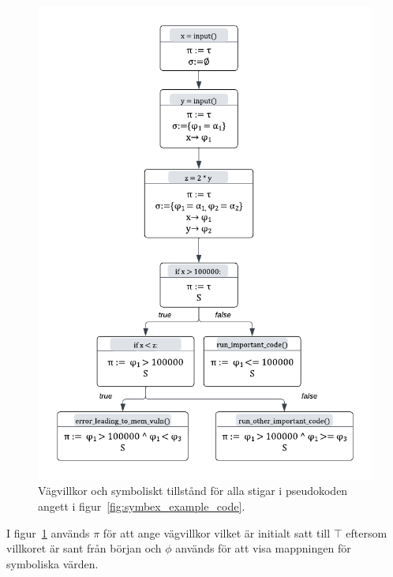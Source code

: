 \begin{figure}
    \centering
    \includegraphics[scale=0.5]{figures/final_symbolic_example_graph.png}
    \caption{Vägvillkor och symboliskt tillstånd för alla stigar i
        pseudokoden angett i figur~\ref{fig:symbex_example_code}.}
    \label{fig:symbex_example_graph}
\end{figure}

I figur~\ref{fig:symbex_example_graph} används $\pi$ för att ange vägvillkor vilket
är initialt satt till $\top$ eftersom villkoret är sant från början och $\phi$
används för att visa mappningen för symboliska värden.

